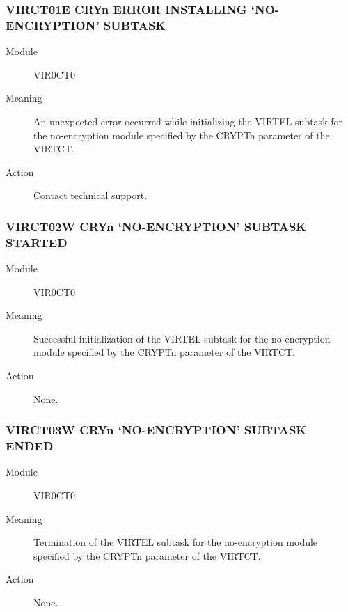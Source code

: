 \documentclass[letterpaper,10pt,english]{sphinxmanual}
\begin{document}
\subsubsection{VIRCT01E CRYn ERROR INSTALLING ‘NO-ENCRYPTION’ SUBTASK}
\label{\detokenize{messages:virct01e-cryn-error-installing-no-encryption-subtask}}\begin{description}
\item[{Module}] \leavevmode
VIR0CT0

\item[{Meaning}] \leavevmode
An unexpected error occurred while initializing the VIRTEL subtask for the no-encryption module specified by the CRYPTn parameter of the VIRTCT.

\item[{Action}] \leavevmode
Contact technical support.

\end{description}


\subsubsection{VIRCT02W CRYn ‘NO-ENCRYPTION’ SUBTASK STARTED}
\label{\detokenize{messages:virct02w-cryn-no-encryption-subtask-started}}\begin{description}
\item[{Module}] \leavevmode
VIR0CT0

\item[{Meaning}] \leavevmode
Successful initialization of the VIRTEL subtask for the no-encryption module specified by the CRYPTn parameter of the VIRTCT.

\item[{Action}] \leavevmode
None.

\end{description}


\subsubsection{VIRCT03W CRYn ‘NO-ENCRYPTION’ SUBTASK ENDED}
\label{\detokenize{messages:virct03w-cryn-no-encryption-subtask-ended}}\begin{description}
\item[{Module}] \leavevmode
VIR0CT0

\item[{Meaning}] \leavevmode
Termination of the VIRTEL subtask for the no-encryption module specified by the CRYPTn parameter of the VIRTCT.

\item[{Action}] \leavevmode
None.

\end{description}
\end{document}
